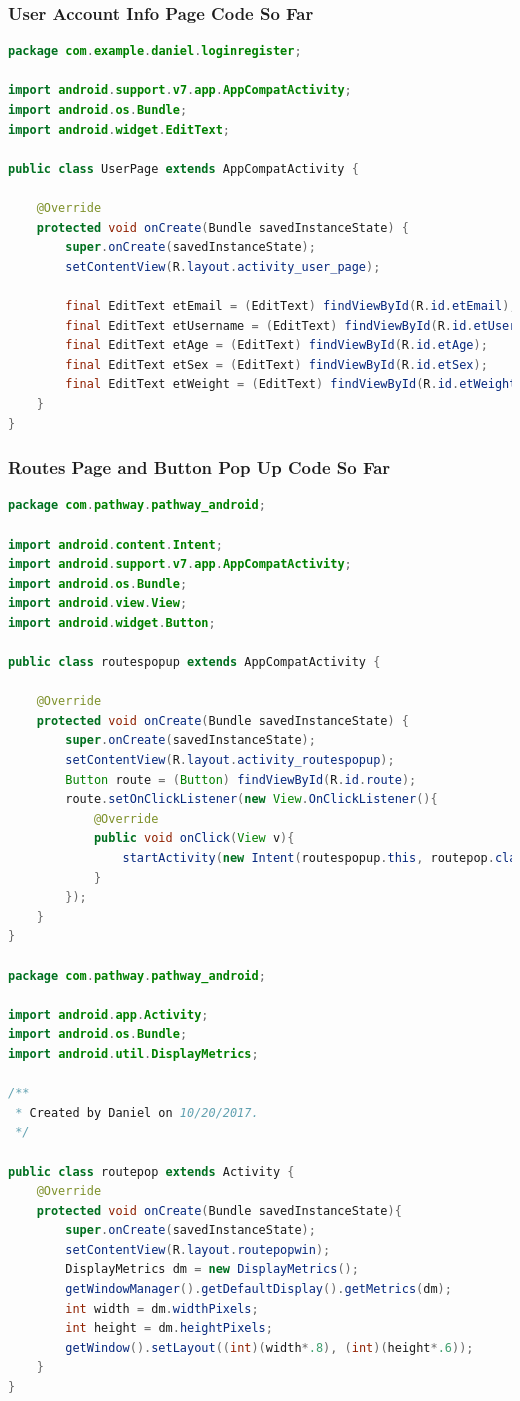 \documentclass{article}
\begin{document}
\subsubsection{User Account Info Page Code So Far}
\begin{lstlisting}[language = Java]
package com.example.daniel.loginregister;

import android.support.v7.app.AppCompatActivity;
import android.os.Bundle;
import android.widget.EditText;

public class UserPage extends AppCompatActivity {

    @Override
    protected void onCreate(Bundle savedInstanceState) {
        super.onCreate(savedInstanceState);
        setContentView(R.layout.activity_user_page);

        final EditText etEmail = (EditText) findViewById(R.id.etEmail);
        final EditText etUsername = (EditText) findViewById(R.id.etUsername);
        final EditText etAge = (EditText) findViewById(R.id.etAge);
        final EditText etSex = (EditText) findViewById(R.id.etSex);
        final EditText etWeight = (EditText) findViewById(R.id.etWeight);
    }
}
\end{lstlisting}

\subsubsection{Routes Page and Button Pop Up Code So Far}
\begin{lstlisting}[language = Java]
package com.pathway.pathway_android;

import android.content.Intent;
import android.support.v7.app.AppCompatActivity;
import android.os.Bundle;
import android.view.View;
import android.widget.Button;

public class routespopup extends AppCompatActivity {

    @Override
    protected void onCreate(Bundle savedInstanceState) {
        super.onCreate(savedInstanceState);
        setContentView(R.layout.activity_routespopup);
        Button route = (Button) findViewById(R.id.route);
        route.setOnClickListener(new View.OnClickListener(){
            @Override
            public void onClick(View v){
                startActivity(new Intent(routespopup.this, routepop.class));
            }
        });
    }
}

package com.pathway.pathway_android;

import android.app.Activity;
import android.os.Bundle;
import android.util.DisplayMetrics;

/**
 * Created by Daniel on 10/20/2017.
 */

public class routepop extends Activity {
    @Override
    protected void onCreate(Bundle savedInstanceState){
        super.onCreate(savedInstanceState);
        setContentView(R.layout.routepopwin);
        DisplayMetrics dm = new DisplayMetrics();
        getWindowManager().getDefaultDisplay().getMetrics(dm);
        int width = dm.widthPixels;
        int height = dm.heightPixels;
        getWindow().setLayout((int)(width*.8), (int)(height*.6));
    }
}
\end{lstlisting}
\end{document}
